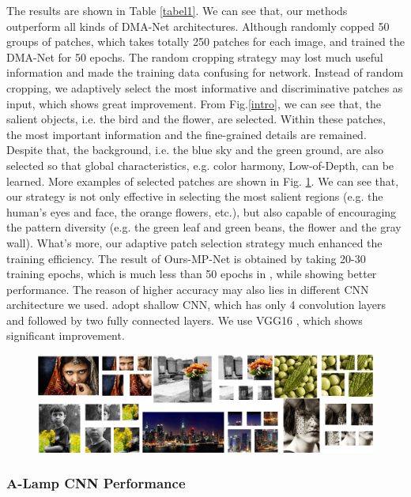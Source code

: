 \documentclass[10pt,twocolumn,letterpaper]{article}
\begin{document}
The results are shown in Table \ref{tabel1}. We can see that, our methods outperform all kinds of DMA-Net architectures.
Although \cite{Lu:2015:ICCV} randomly copped 50 groups of patches, which takes totally 250 patches for each image, and trained the DMA-Net for 50 epochs. The random cropping strategy may lost much useful information and made the training data confusing for network. Instead of random cropping, we adaptively select the most informative and discriminative patches as input, which shows great improvement. From Fig.\ref{intro}, we can see that, the salient objects, i.e. the bird and the flower, are selected. Within these patches, the most important information and the fine-grained details are remained. Despite that, the background, i.e. the blue sky and the green ground, are also selected so that global characteristics, e.g. color harmony, Low-of-Depth, can be learned. More examples of selected patches are shown in Fig. \ref{patches}. We can see that, our strategy is not only effective in selecting the most salient regions (e.g. the human's eyes and face, the orange flowers, etc.), but also capable of encouraging the pattern diversity (e.g. the green leaf and green beans, the flower and the gray wall).
What's more, our adaptive patch selection strategy much enhanced the training efficiency. The result of Ours-MP-Net is obtained by taking 20-30 training epochs, which is much less than 50 epochs in \cite{Lu:2015:ICCV}, while showing better performance.
The reason of higher accuracy may also lies in different CNN architecture we used. \cite{Lu:2015:ICCV} adopt shallow CNN, which has only 4 convolution layers and followed by two fully connected layers. We use VGG16 \cite{Simonyan14c:2014:VGG}, which shows significant improvement.

\begin{figure}
	\centering
	\includegraphics[scale=0.15]{figures/patch_selection.jpg}
	\label{patches}
\end{figure}

\subsubsection{A-Lamp CNN Performance}
\end{document}
